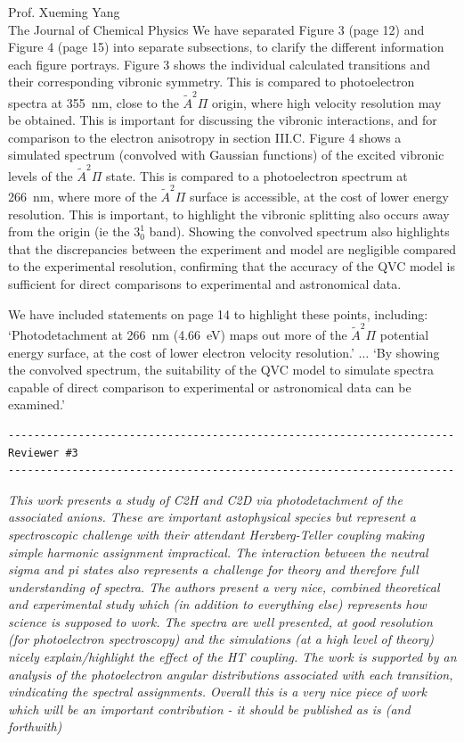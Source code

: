 \documentclass[a4paper,12pt]{letter}
\begin{document}
\begin{sf}
\begin{letter}{%
Prof. Xueming Yang\\
The Journal of Chemical Physics
}
We have separated Figure 3 (page 12) and Figure 4 (page 15) into separate subsections, to clarify the different information each figure portrays. Figure 3 shows the individual calculated transitions and their corresponding vibronic symmetry. This is compared to photoelectron spectra at 355~nm, close to the $\tilde{A} ^2\Pi$ origin, where high velocity resolution may be obtained. This is important for discussing the vibronic interactions, and for comparison to the electron anisotropy in section III.C. Figure 4 shows a simulated spectrum (convolved with Gaussian functions) of the excited vibronic levels of the $\tilde{A} ^2\Pi$ state. This is compared to a photoelectron spectrum at 266~nm, where more of the $\tilde{A} ^2\Pi$ surface is accessible, at the cost of lower energy resolution. This is important, to highlight the vibronic splitting also occurs away from the origin (ie the $3^1_0$ band). Showing the convolved spectrum also highlights that the discrepancies between the experiment and model are negligible compared to the experimental resolution, confirming that the accuracy of the QVC model is sufficient for direct comparisons to experimental and astronomical data.

We have included statements on page 14 to highlight these points, including: `Photodetachment at 266~nm (4.66~eV) maps out more of the $\tilde{A} ^2\Pi$ potential energy surface, at the cost of lower electron velocity resolution.' $\dots$ `By showing the convolved spectrum, the suitability of the QVC model to simulate spectra capable of direct comparison to experimental or astronomical data can be examined.' 
\vspace*{-2ex}
\begin{verbatim}
----------------------------------------------------------------------
Reviewer #3  
----------------------------------------------------------------------
\end{verbatim}
\vspace*{-2ex}
\emph{This work presents a study of C2H and C2D via photodetachment of the associated anions. These are important astophysical species but represent a spectroscopic challenge with their attendant Herzberg-Teller coupling making simple harmonic assignment impractical. The interaction between the neutral sigma and pi states also represents a challenge for theory and therefore full understanding of spectra.
	The authors present a very nice, combined theoretical and experimental study which (in addition to everything else) represents how science is supposed to work. The spectra are well presented, at good resolution (for photoelectron spectroscopy) and the simulations (at a high level of theory) nicely explain/highlight the effect of the HT coupling. The work is supported by an analysis of the photoelectron angular distributions associated with each transition, vindicating the spectral assignments.
	Overall this is a very nice piece of work which will be an important contribution - it should be published as is (and forthwith)}


\end{letter}
\end{sf}
\end{document}
